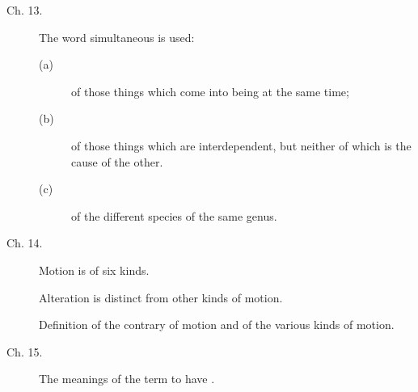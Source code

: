 \begin{description}
\item[Ch. 13.] The word simultaneous is used: 
\begin{description}
\item[(a)] of those things which come into being at the same time;
\item[(b)] of those things which are interdependent, but neither of which is the cause of the other.
\item[(c)] of the different species of the same genus. 
\end{description}

\item[Ch. 14.] Motion is of six kinds. 

Alteration is distinct from other kinds of motion. 

Definition of the contrary of motion and of the various kinds of 
motion. 

\item[Ch. 15.] The meanings of the term to have . 
\end{description}

\renewcommand{\aref}{\arefC}
